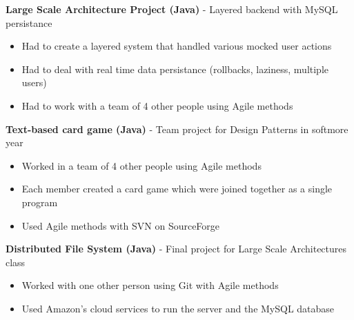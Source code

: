 \documentclass[margin,line, 11pt]{resume}
\begin{document}
\begin{resume}
     \textbf{Large Scale Architecture Project (Java)} - Layered backend with MySQL persistance
     \begin{itemize}
      \item Had to create a layered system that handled various mocked user actions
      \item Had to deal with real time data persistance (rollbacks, laziness, multiple users)
      \item Had to work with a team of 4 other people using Agile methods
     \end{itemize}

    \textbf{Text-based card game (Java)} - Team project for Design Patterns in softmore year
	\begin{itemize}
	  \item Worked in a team of 4 other people using Agile methods
	  \item Each member created a card game which were joined together as a single program
	  \item Used Agile methods with SVN on SourceForge
	\end{itemize}

    \textbf{Distributed File System (Java)} - Final project for Large Scale Architectures class
	\begin{itemize}
	  \item Worked with one other person using Git with Agile methods
	  \item Used Amazon's cloud services to run the server and the MySQL database
	\end{itemize}

% 

%      
     


\end{resume}
\end{document}
